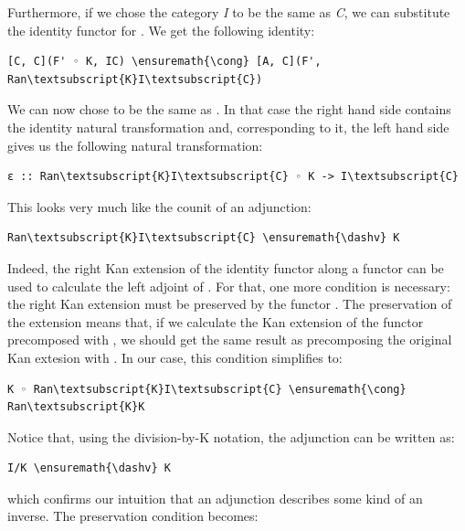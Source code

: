 \noindent
Furthermore, if we chose the category \emph{I} to be the same as
\emph{C}, we can substitute the identity functor  for
. We get the following identity:

\begin{Verbatim}[commandchars=\\\{\}]
[C, C](F' ◦ K, IC) \ensuremath{\cong} [A, C](F', Ran\textsubscript{K}I\textsubscript{C})
\end{Verbatim}
We can now chose  to be the same as . In
that case the right hand side contains the identity natural
transformation and, corresponding to it, the left hand side gives us the
following natural transformation:

\begin{Verbatim}[commandchars=\\\{\}]
ε :: Ran\textsubscript{K}I\textsubscript{C} ◦ K -> I\textsubscript{C}
\end{Verbatim}
This looks very much like the counit of an adjunction:

\begin{Verbatim}[commandchars=\\\{\}]
Ran\textsubscript{K}I\textsubscript{C} \ensuremath{\dashv} K
\end{Verbatim}
Indeed, the right Kan extension of the identity functor along a functor
 can be used to calculate the left adjoint of . For
that, one more condition is necessary: the right Kan extension must be
preserved by the functor . The preservation of the extension
means that, if we calculate the Kan extension of the functor precomposed
with , we should get the same result as precomposing the
original Kan extesion with . In our case, this condition
simplifies to:

\begin{Verbatim}[commandchars=\\\{\}]
K ◦ Ran\textsubscript{K}I\textsubscript{C} \ensuremath{\cong} Ran\textsubscript{K}K
\end{Verbatim}
Notice that, using the division-by-K notation, the adjunction can be
written as:

\begin{Verbatim}[commandchars=\\\{\}]
I/K \ensuremath{\dashv} K
\end{Verbatim}
which confirms our intuition that an adjunction describes some kind of
an inverse. The preservation condition becomes:


